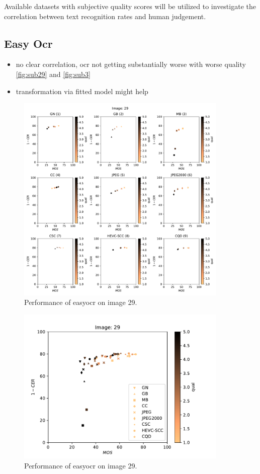 Available datasets with subjective quality scores will be utilized to investigate
the correlation between text recognition rates and human judgement.

\subsection{Easy Ocr}

\begin{itemize}
\item no clear correlation, ocr not getting substantially worse with worse quality \autoref{fig:sub29} and \autoref{fig:sub3}
\item transformation via fitted model might help
\end{itemize}

\begin{figure}[h]
\centering
\includegraphics[width=0.9\textwidth]{../../images/analyze/mos_ter_ezocr_sub_img29.pdf}
\caption{Performance of easyocr on image 29.}
\label{fig:sub29}
\end{figure}

\begin{figure}[h]
\centering
\includegraphics[width=0.9\textwidth]{../../images/analyze/mos_ter_ezocr_img29.pdf}
\caption{Performance of easyocr on image 29.}
\label{fig:img29}
\end{figure}

